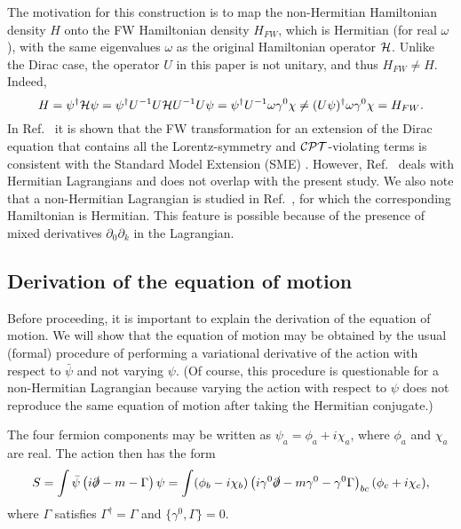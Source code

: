 \documentclass[11pt,prd,aps,amssymb,amsmath,tightenlines,showpacs]{revtex4}
\newcommand{\cH}{{\cal H}}
\newcommand{\cCPT}{{\cal CPT}}
\begin{document}
The motivation for this construction is to map the non-Hermitian Hamiltonian
density $H$ onto the FW Hamiltonian density $H_{FW}$, which is Hermitian (for
real $\omega$), with the same eigenvalues $\omega$ as the original Hamiltonian
operator $\cH$. Unlike the Dirac case, the operator $U$ in this paper is not
unitary, and thus $H_{FW}\neq H$. Indeed, 
\begin{equation}
H=\psi^\dag\cH\psi=\psi^\dag U^{-1}U\cH U^{-1}U\psi=\psi^\dag
U^{-1}\omega\gamma^0\chi\neq(U\psi)^\dag\omega\gamma^0\chi=H_{FW}.
\label{e1}
\end{equation}
In Ref.~\cite{r6} it is shown that the FW transformation for an extension of
the Dirac equation that contains all the Lorentz-symmetry and $\cCPT$-violating
terms is consistent with the Standard Model Extension (SME) \cite{r7}. However,
Ref.~\cite{r6} deals with Hermitian Lagrangians and does not overlap with the
present study. We also note that a non-Hermitian Lagrangian is studied in
Ref.~\cite{r8}, for which the corresponding Hamiltonian is Hermitian. This
feature is possible because of the presence of mixed derivatives $\partial_0
\partial_k$ in the Lagrangian.
 
\subsection{Derivation of the equation of motion}
Before proceeding, it is important to explain the derivation of the equation of
motion. We will show that the equation of motion may be obtained by the usual
(formal) procedure of performing a variational derivative of the action with
respect to $\bar\psi$ and not varying $\psi$. (Of course, this procedure is
questionable for a non-Hermitian Lagrangian because varying the action with
respect to $\psi$ does not reproduce the same equation of motion after taking
the Hermitian conjugate.) 
 
The four fermion components may be written as $\psi_a=\phi_a+i\chi_a$, where
$\phi_a$ and $\chi_a$ are real. The action then has the form
$$S=\int\bar\psi\left(i\slashed\partial-m-\Gamma\right)\psi=\int(\phi_b-i\chi_b)
\left(i\gamma^0\slashed\partial-m\gamma^0-\gamma^0\Gamma\right)_{bc}(\phi_c+
i\chi_c),$$
where $\Gamma$ satisfies $\Gamma^\dag=\Gamma$ and $\{\gamma^0,\Gamma\}=0$.
\end{document}
